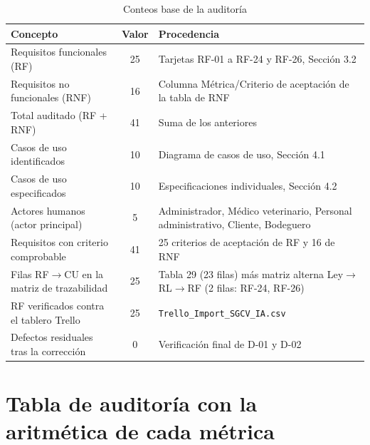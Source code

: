 \begin{table}[h]
\centering
\footnotesize
\caption{Conteos base de la auditoría}
\label{tab:conteos}
\begin{tabular}{|p{7.2cm}|c|p{6.0cm}|}
\hline
\textbf{Concepto} & \textbf{Valor} & \textbf{Procedencia} \\ \hline
Requisitos funcionales (RF) & 25 &
Tarjetas RF-01 a RF-24 y RF-26, Sección 3.2 \\ \hline
Requisitos no funcionales (RNF) & 16 &
Columna Métrica/Criterio de aceptación de la tabla de RNF \\ \hline
Total auditado (RF + RNF) & 41 &
Suma de los anteriores \\ \hline
Casos de uso identificados & 10 &
Diagrama de casos de uso, Sección 4.1 \\ \hline
Casos de uso especificados & 10 &
Especificaciones individuales, Sección 4.2 \\ \hline
Actores humanos (actor principal) & 5 &
Administrador, Médico veterinario, Personal administrativo, Cliente, Bodeguero \\ \hline
Requisitos con criterio comprobable & 41 &
25 criterios de aceptación de RF y 16 de RNF \\ \hline
Filas RF$\to$CU en la matriz de trazabilidad & 25 &
Tabla 29 (23 filas) más matriz alterna Ley$\to$RL$\to$RF
(2 filas: RF-24, RF-26) \\ \hline
RF verificados contra el tablero Trello & 25 &
\texttt{Trello\_Import\_SGCV\_IA.csv} \\ \hline
Defectos residuales tras la corrección & 0 &
Verificación final de D-01 y D-02 \\ \hline
\end{tabular}
\end{table}

\section{Tabla de auditoría con la aritmética de cada métrica}

